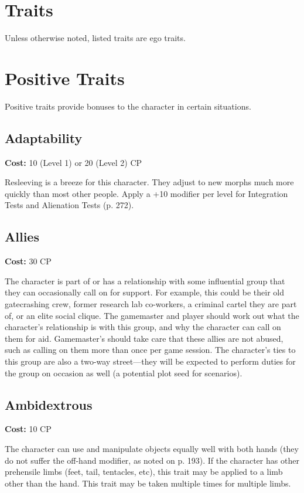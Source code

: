 \section{Traits} Unless otherwise noted, listed traits are ego traits. 

\section{Positive Traits} \label{sec:positive-traits} Positive traits provide bonuses to the character in certain situations. 

\subsection{Adaptability} \label{sec:traits-adaptability} 

\textbf{Cost:} 10 (Level 1) or 20 (Level 2) CP 

Resleeving is a breeze for this character. They adjust to new morphs much more quickly than most other people. Apply a +10 modifier per level for Integration Tests and Alienation Tests (p. 272). 

\subsection{Allies} \label{sec:traits-allies} 

\textbf{Cost:} 30 CP 

The character is part of or has a relationship with some influential group that they can occasionally call on for support. For example, this could be their old gatecrashing crew, former research lab co-workers, a criminal cartel they are part of, or an elite social clique. The gamemaster and player should work out what the character’s relationship is with this group, and why the character can call on them for aid. Gamemaster’s should take care that these allies are not abused, such as calling on them more than once per game session. The character’s ties to this group are also a two-way street—they will be expected to perform duties for the group on occasion as well (a potential plot seed for scenarios). 

\subsection{Ambidextrous} \label{sec:traits-ambidextrous} 

\textbf{Cost:} 10 CP 

The character can use and manipulate objects equally well with both hands (they do not suffer the off-hand modifier, as noted on p. 193). If the character has other prehensile limbs (feet, tail, tentacles, etc), this trait may be applied to a limb other than the hand. This trait may be taken multiple times for multiple limbs. 

